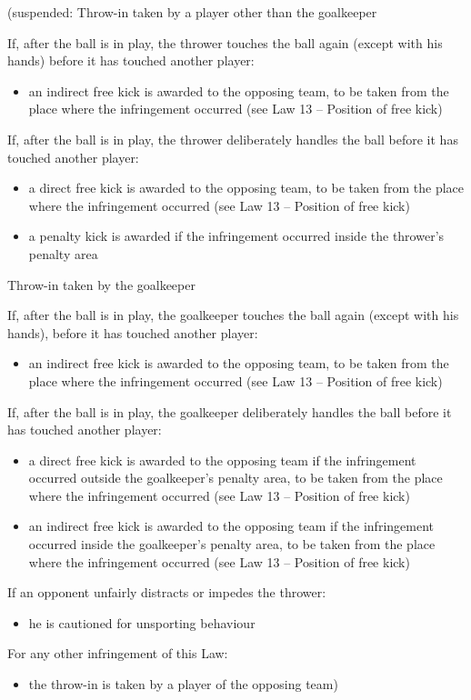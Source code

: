 {\color[rgb]{0.4,0.4,0.4}
(suspended: Throw-in taken by a player other than the goalkeeper

If, after the ball is in play, the thrower touches the ball again
(except with his hands) before it has touched another player:

\begin{itemize}
\item an indirect free kick is awarded to the opposing team, to be taken from
the place where the infringement occurred (see Law 13 -- Position of
free kick)
\end{itemize}

\bigskip

If, after the ball is in play, the thrower deliberately handles the ball
before it has touched another player:

\begin{itemize}
\item a direct free kick is awarded to the opposing team, to be taken from the
place where the infringement occurred (see Law 13 -- Position of free
kick)
\item a penalty kick is awarded if the infringement occurred inside the
thrower's penalty area
\end{itemize}

\bigskip

Throw-in taken by the goalkeeper

If, after the ball is in play, the goalkeeper touches the ball again
(except with his hands), before it has touched another player:

\begin{itemize}
\item an indirect free kick is awarded to the opposing team, to be taken from
the place where the infringement occurred (see Law 13 -- Position of
free kick)
\end{itemize}

\bigskip

If, after the ball is in play, the goalkeeper deliberately handles the
ball before it has touched another player:

\begin{itemize}
\item a direct free kick is awarded to the opposing team if the infringement
occurred outside the goalkeeper{\textquoteright}s penalty area, to be
taken from the place where the infringement occurred (see Law 13 --
Position of free kick)
\item an indirect free kick is awarded to the opposing team if the
infringement occurred inside the goalkeeper{\textquoteright}s penalty
area, to be taken from the place where the infringement occurred (see
Law 13 -- Position of free kick)
\end{itemize}

\bigskip

If an opponent unfairly distracts or impedes the thrower:

\begin{itemize}
\item he is cautioned for unsporting behaviour
\end{itemize}

\bigskip

For any other infringement of this Law:

\begin{itemize}
\item the throw-in is taken by a player of the opposing team)
\end{itemize}
}